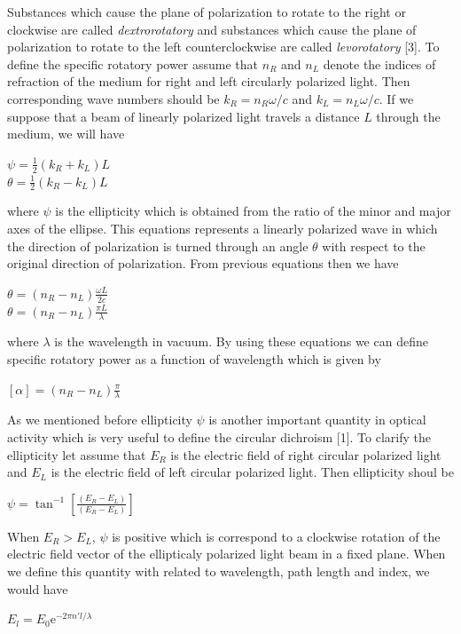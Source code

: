 \documentclass[a4paper,12pt]{report}
\begin{document}
Substances which cause the plane of polarization to rotate to the right or clockwise are called \textit{dextrorotatory} and  substances which cause the plane of polarization to rotate to the left counterclockwise are called \textit{levorotatory} [3]. To define the specific rotatory power assume that $n_{R}$ and $n_{L}$ denote the indices of refraction of the medium for right and left circularly polarized light. Then corresponding wave numbers should be $k_{R}=n_{R}\omega/c$ and $k_{L}=n_{L}\omega/c$. If we suppose that a beam of linearly polarized light travels a distance $L$ through the medium, we will have 
\begin{center}
	$\psi=\frac{1}{2}(k_{R}+k_{L})L$\\ 
$\theta=\frac{1}{2}(k_{R}-k_{L})L$ 
\end{center} 
where $\psi$ is the ellipticity which is obtained from the ratio of the minor and major axes of the ellipse. This equations represents a linearly polarized wave in which the direction of polarization is turned through an angle $\theta$ with respect to the original direction of polarization. From previous equations then we have 
\begin{center}
	$\theta=(n_{R}-n_{L})\frac{\omega L}{2c}$\\
$\theta=(n_{R}-n_{L})\frac{\pi L}{\lambda}$
\end{center}
where $\lambda$ is the wavelength in vacuum. By using these equations we can define specific rotatory power as a function of wavelength which is given by 
\begin{center}
	$[\alpha]=(n_{R}-n_{L})\frac{\pi}{\lambda}$
\end{center}
As we mentioned before ellipticity $\psi$ is another important quantity in optical activity which is very useful to define the circular dichroism [1]. To clarify the ellipticity let assume that $E_{R}$ is the electric field of right circular polarized light and $E_{L}$ is the electric field of left circular polarized light. Then  ellipticity shoul be 
\begin{center}
	$\psi=\tan^{-1}[\frac{(E_{R}-E_{L})}{(E_{R}-E_{L})}]$
\end{center}
When $E_{R}>E_{L}$, $\psi$ is positive which is correspond to a clockwise rotation of the electric field vector of the ellipticaly polarized light beam in a fixed plane. When we define this quantity with related to wavelength, path length and index, we would have 
\begin{center}
	$E_{l}=E_{0}$e$^{-2\pi n'l/\lambda}$
\end{center}
\end{document}
